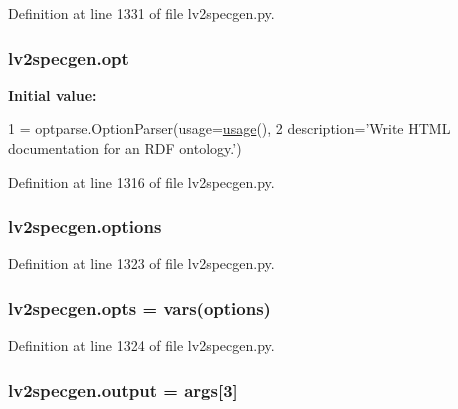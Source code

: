 Definition at line 1331 of file lv2specgen.\+py.

\subsubsection[{\texorpdfstring{opt}{opt}}]{\setlength{\rightskip}{0pt plus 5cm}lv2specgen.\+opt}\hypertarget{namespacelv2specgen_ae29432791328f0b87bdf9b9b475b79cb}{}\label{namespacelv2specgen_ae29432791328f0b87bdf9b9b475b79cb}
{\bfseries Initial value\+:}
\begin{DoxyCode}
1 = optparse.OptionParser(usage=\hyperlink{namespacelv2specgen_a784d3ed7785c9bbbabc2c17fb7b0c9b1}{usage}(),
2                                 description=\textcolor{stringliteral}{'Write HTML documentation for an RDF ontology.'})
\end{DoxyCode}


Definition at line 1316 of file lv2specgen.\+py.

\subsubsection[{\texorpdfstring{options}{options}}]{\setlength{\rightskip}{0pt plus 5cm}lv2specgen.\+options}\hypertarget{namespacelv2specgen_a32e0c38ade65159ec3ff05fe9bcd4d27}{}\label{namespacelv2specgen_a32e0c38ade65159ec3ff05fe9bcd4d27}


Definition at line 1323 of file lv2specgen.\+py.

\subsubsection[{\texorpdfstring{opts}{opts}}]{\setlength{\rightskip}{0pt plus 5cm}lv2specgen.\+opts = vars({\bf options})}\hypertarget{namespacelv2specgen_a3418d48f73144afbd9db69c0c1aaf6b8}{}\label{namespacelv2specgen_a3418d48f73144afbd9db69c0c1aaf6b8}


Definition at line 1324 of file lv2specgen.\+py.

\subsubsection[{\texorpdfstring{output}{output}}]{\setlength{\rightskip}{0pt plus 5cm}lv2specgen.\+output = {\bf args}\mbox{[}3\mbox{]}}\hypertarget{namespacelv2specgen_a653e2b7722801dea4d25040ac958b631}{}\label{namespacelv2specgen_a653e2b7722801dea4d25040ac958b631}


